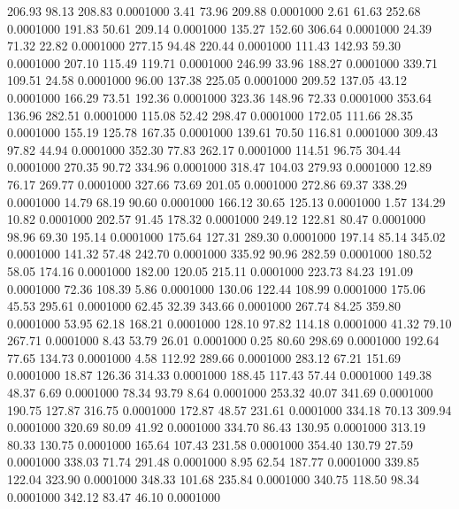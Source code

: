  206.93   98.13  208.83   0.0001000
   3.41   73.96  209.88   0.0001000
   2.61   61.63  252.68   0.0001000
 191.83   50.61  209.14   0.0001000
 135.27  152.60  306.64   0.0001000
  24.39   71.32   22.82   0.0001000
 277.15   94.48  220.44   0.0001000
 111.43  142.93   59.30   0.0001000
 207.10  115.49  119.71   0.0001000
 246.99   33.96  188.27   0.0001000
 339.71  109.51   24.58   0.0001000
  96.00  137.38  225.05   0.0001000
 209.52  137.05   43.12   0.0001000
 166.29   73.51  192.36   0.0001000
 323.36  148.96   72.33   0.0001000
 353.64  136.96  282.51   0.0001000
 115.08   52.42  298.47   0.0001000
 172.05  111.66   28.35   0.0001000
 155.19  125.78  167.35   0.0001000
 139.61   70.50  116.81   0.0001000
 309.43   97.82   44.94   0.0001000
 352.30   77.83  262.17   0.0001000
 114.51   96.75  304.44   0.0001000
 270.35   90.72  334.96   0.0001000
 318.47  104.03  279.93   0.0001000
  12.89   76.17  269.77   0.0001000
 327.66   73.69  201.05   0.0001000
 272.86   69.37  338.29   0.0001000
  14.79   68.19   90.60   0.0001000
 166.12   30.65  125.13   0.0001000
   1.57  134.29   10.82   0.0001000
 202.57   91.45  178.32   0.0001000
 249.12  122.81   80.47   0.0001000
  98.96   69.30  195.14   0.0001000
 175.64  127.31  289.30   0.0001000
 197.14   85.14  345.02   0.0001000
 141.32   57.48  242.70   0.0001000
 335.92   90.96  282.59   0.0001000
 180.52   58.05  174.16   0.0001000
 182.00  120.05  215.11   0.0001000
 223.73   84.23  191.09   0.0001000
  72.36  108.39    5.86   0.0001000
 130.06  122.44  108.99   0.0001000
 175.06   45.53  295.61   0.0001000
  62.45   32.39  343.66   0.0001000
 267.74   84.25  359.80   0.0001000
  53.95   62.18  168.21   0.0001000
 128.10   97.82  114.18   0.0001000
  41.32   79.10  267.71   0.0001000
   8.43   53.79   26.01   0.0001000
   0.25   80.60  298.69   0.0001000
 192.64   77.65  134.73   0.0001000
   4.58  112.92  289.66   0.0001000
 283.12   67.21  151.69   0.0001000
  18.87  126.36  314.33   0.0001000
 188.45  117.43   57.44   0.0001000
 149.38   48.37    6.69   0.0001000
  78.34   93.79    8.64   0.0001000
 253.32   40.07  341.69   0.0001000
 190.75  127.87  316.75   0.0001000
 172.87   48.57  231.61   0.0001000
 334.18   70.13  309.94   0.0001000
 320.69   80.09   41.92   0.0001000
 334.70   86.43  130.95   0.0001000
 313.19   80.33  130.75   0.0001000
 165.64  107.43  231.58   0.0001000
 354.40  130.79   27.59   0.0001000
 338.03   71.74  291.48   0.0001000
   8.95   62.54  187.77   0.0001000
 339.85  122.04  323.90   0.0001000
 348.33  101.68  235.84   0.0001000
 340.75  118.50   98.34   0.0001000
 342.12   83.47   46.10   0.0001000
